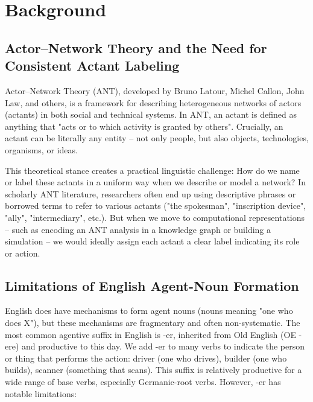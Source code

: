 \documentclass[11pt]{article}
\begin{document}
\section{Background}

\subsection{Actor–Network Theory and the Need for Consistent Actant Labeling}

Actor–Network Theory (ANT), developed by Bruno Latour, Michel Callon, John Law, and others, is a framework for describing heterogeneous networks of actors (actants) in both social and technical systems. In ANT, an actant is defined as anything that "acts or to which activity is granted by others". Crucially, an actant can be literally any entity – not only people, but also objects, technologies, organisms, or ideas.

This theoretical stance creates a practical linguistic challenge: How do we name or label these actants in a uniform way when we describe or model a network? In scholarly ANT literature, researchers often end up using descriptive phrases or borrowed terms to refer to various actants ("the spokesman", "inscription device", "ally", "intermediary", etc.). But when we move to computational representations – such as encoding an ANT analysis in a knowledge graph or building a simulation – we would ideally assign each actant a clear label indicating its role or action.

\subsection{Limitations of English Agent-Noun Formation}

English does have mechanisms to form agent nouns (nouns meaning "one who does X"), but these mechanisms are fragmentary and often non-systematic. The most common agentive suffix in English is -er, inherited from Old English (OE -ere) and productive to this day. We add -er to many verbs to indicate the person or thing that performs the action: driver (one who drives), builder (one who builds), scanner (something that scans). This suffix is relatively productive for a wide range of base verbs, especially Germanic-root verbs. However, -er has notable limitations:
\end{document}

